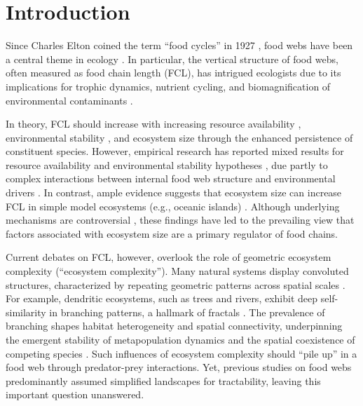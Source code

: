 \documentclass[11pt, class=article, crop=false]{standalone}
\begin{document}
\newpage

\section{Introduction}
Since Charles Elton coined the term ``food cycles'' in 1927 \citep{elton_animal_1927}, food webs have been a central theme in ecology \citep{paine_food_1966, pimm_food_1991, post_long_2002}.
In particular, the vertical structure of food webs, often measured as food chain length (FCL), has intrigued ecologists due to its implications for trophic dynamics, nutrient cycling, and biomagnification of environmental contaminants \citep{post_long_2002}.

In theory, FCL should increase with increasing resource availability \citep{oksanen_exploitation_1981}, environmental stability \citep{pimm_number_1977}, and ecosystem size \citep{schoener_food_1989} through the enhanced persistence of constituent species.
However, empirical research has reported mixed results for resource availability and environmental stability hypotheses \citep{takimoto_environmental_2013, warfe_productivity_2013, guo_towards_2023}, due partly to complex interactions between internal food web structure and environmental drivers \citep{takimoto_effects_2012, shibasaki_food_2024}.
In contrast, ample evidence suggests that ecosystem size can increase FCL in simple model ecosystems (e.g., oceanic islands) \citep{vander_zanden_patterns_1999, post_ecosystem_2000, takimoto_ecosystem_2008, doi_resource_2009}.
Although underlying mechanisms are controversial \citep{takimoto_effects_2012, ward_mechanistic_2017, mcintosh_capacity_2018, terui_spatial_2019}, these findings have led to the prevailing view that factors associated with ecosystem size are a primary regulator of food chains.

Current debates on FCL, however, overlook the role of geometric ecosystem complexity (``ecosystem complexity'').
Many natural systems display convoluted structures, characterized by repeating geometric patterns across spatial scales \citep{rodriguez-iturbe_fractal_2001, turner_landscape_2015}.
For example, dendritic ecosystems, such as trees and rivers, exhibit deep self-similarity in branching patterns, a hallmark of fractals \citep{rodriguez-iturbe_fractal_2001, terui_revisiting_2024}.
The prevalence of branching shapes habitat heterogeneity and spatial connectivity, underpinning the emergent stability of metapopulation dynamics \citep{yeakel_synchronisation_2014, moore_emergent_2015, terui_metapopulation_2018} and the spatial coexistence of competing species  \citep{terui_emergent_2021}.
Such influences of ecosystem complexity should ``pile up'' in a food web through predator-prey interactions.
Yet, previous studies on food webs predominantly assumed simplified landscapes for tractability, leaving this important question unanswered.
\end{document}
